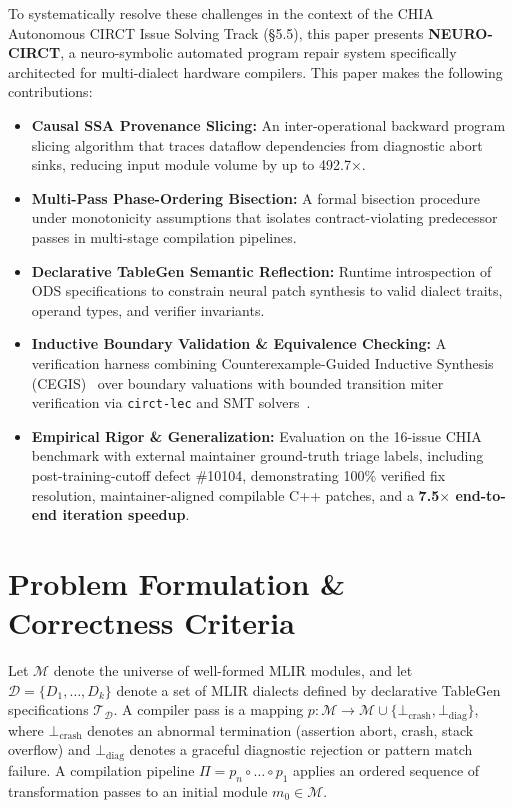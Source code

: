 \documentclass[conference]{IEEEtran}
\begin{document}
To systematically resolve these challenges in the context of the CHIA Autonomous CIRCT Issue Solving Track (\S5.5), this paper presents \textbf{NEURO-CIRCT}, a neuro-symbolic automated program repair system specifically architected for multi-dialect hardware compilers. This paper makes the following contributions:
\begin{itemize}
    \item \textbf{Causal SSA Provenance Slicing:} An inter-operational backward program slicing algorithm that traces dataflow dependencies from diagnostic abort sinks, reducing input module volume by up to 492.7$\times$.
    \item \textbf{Multi-Pass Phase-Ordering Bisection:} A formal bisection procedure under monotonicity assumptions that isolates contract-violating predecessor passes in multi-stage compilation pipelines.
    \item \textbf{Declarative TableGen Semantic Reflection:} Runtime introspection of ODS specifications to constrain neural patch synthesis to valid dialect traits, operand types, and verifier invariants.
    \item \textbf{Inductive Boundary Validation \& Equivalence Checking:} A verification harness combining Counterexample-Guided Inductive Synthesis (CEGIS)~\cite{solarlezama2006cegis} over boundary valuations with bounded transition miter verification via \texttt{circt-lec} and SMT solvers~\cite{demoura2008z3, niemetz2023bitwuzla}.
    \item \textbf{Empirical Rigor \& Generalization:} Evaluation on the 16-issue CHIA benchmark with external maintainer ground-truth triage labels, including post-training-cutoff defect \#10104, demonstrating 100\% verified fix resolution, maintainer-aligned compilable C++ patches, and a \textbf{7.5$\times$ end-to-end iteration speedup}.
\end{itemize}

\section{Problem Formulation \& Correctness Criteria}
Let $\mathcal{M}$ denote the universe of well-formed MLIR modules, and let $\mathcal{D} = \{D_1, \dots, D_k\}$ denote a set of MLIR dialects defined by declarative TableGen specifications $\mathcal{T}_{\mathcal{D}}$. A compiler pass is a mapping $p: \mathcal{M} \to \mathcal{M} \cup \{\bot_{\text{crash}}, \bot_{\text{diag}}\}$, where $\bot_{\text{crash}}$ denotes an abnormal termination (assertion abort, crash, stack overflow) and $\bot_{\text{diag}}$ denotes a graceful diagnostic rejection or pattern match failure. A compilation pipeline $\Pi = p_n \circ \dots \circ p_1$ applies an ordered sequence of transformation passes to an initial module $m_0 \in \mathcal{M}$.
\end{document}

